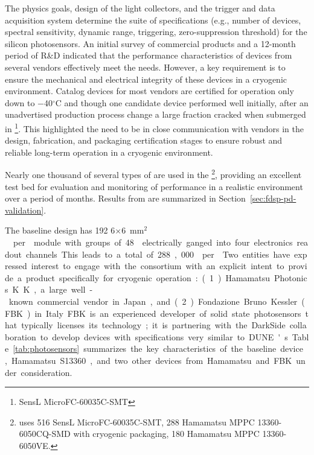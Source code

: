 The physics goals,  design of the light collectors, and the trigger and data acquisition system determine the suite of  specifications (e.g., number of devices, spectral sensitivity, dynamic range, triggering, zero-suppression threshold) for the silicon photosensors. An initial survey of commercial products and a 12-month period of R\&D indicated that the performance characteristics of devices from several vendors effectively meet the  needs. 
However, a key requirement is to ensure the mechanical and electrical integrity of these devices in a cryogenic environment. Catalog devices for most vendors are certified for operation only down to \num{-40}$^\circ$C and though one candidate device performed well initially, after an unadvertised production process change a large fraction cracked when submerged in \footnote{SensL MicroFC-60035C-SMT}. This highlighted the need to be in close communication with vendors in the 
 design, fabrication, and packaging certification stages to ensure 
robust and reliable long-term operation in a cryogenic environment. 

Nearly one thousand of several types of  are used in the  \footnote{  uses 516 SensL MicroFC-60035C-SMT, 288 Hamamatsu MPPC 13360-6050CQ-SMD with cryogenic packaging, 180 Hamamatsu MPPC 13360-6050VE.}, providing an excellent test bed for evaluation and monitoring of  performance in a realistic environment over a period of months. Results from  are summarized in Section~\ref{sec:fdsp-pd-validation}.

The baseline  design has 192 \num{6}$\times$\SI{6}{mm$^2$}  per  module with groups of 48  electrically ganged into four electronics readout channels. This leads to a total of 288,000  per . 

Two entities have expressed interest to engage with the consortium with an explicit intent to provide a product specifically for cryogenic operation: (1) Hamamatsu Photonics K.K., a large well-known commercial vendor in Japan, and (2) Fondazione Bruno Kessler (FBK) in Italy. FBK is an experienced developer of solid state photosensors that typically licenses its technology; it is partnering with the DarkSide collaboration to develop devices with specifications very similar to DUNE's.  Table~\ref{tab:photosensors} summarizes the key characteristics of the baseline device, Hamamatsu S13360, and two other devices from Hamamatsu and FBK under consideration.

